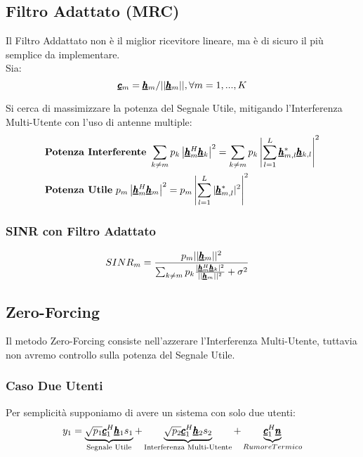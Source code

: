 \subsection{Filtro Adattato (MRC)}
Il Filtro Addattato non è il miglior ricevitore lineare, ma è di sicuro il più semplice da implementare.\\
Sia:
\begin{equation*}
    \pmb{\underline{c}}_m = \pmb{\underline{h}}_m / ||\pmb{\underline{h}}_m||, \forall m = 1,...,K
\end{equation*}

Si cerca di massimizzare la potenza del Segnale Utile, mitigando l'Interferenza Multi-Utente con l'uso di antenne multiple:
\begin{equation*}
\begin{aligned}
      &\textbf{Potenza Interferente} \ \sum_{k \neq m} p_k \left|\pmb{\underline{h}}^H_m \pmb{\underline{h}}_k  \right|^2 = \sum_{k \neq m} p_k \left|\sum_{l=1}^L \pmb{\underline{h}}^*_{m,l} \pmb{\underline{h}}_{k,l}  \right|^2 \\
    &\textbf{Potenza Utile} \ p_m \left|\pmb{\underline{h}}^H_m \pmb{\underline{h}}_m  \right|^2 = p_m \left|\sum_{l=1}^L |\pmb{\underline{h}}^*_{m,l}|^2 \right|^2
\end{aligned}
\end{equation*}

\subsubsection{SINR con Filtro Adattato}

\begin{equation*}
    \begin{aligned}
          SINR_m &= \frac{p_m ||\pmb{\underline{h}}_m||^2}{\sum_{k \neq m} p_k \frac{|\pmb{\underline{h}}^H_m \pmb{\underline{h}}_k |^2}{||\pmb{\underline{h}}_m||^2}+ \sigma^2}
    \end{aligned}
\end{equation*}


\subsection{Zero-Forcing}
Il metodo Zero-Forcing consiste nell'azzerare l'Interferenza Multi-Utente, tuttavia non avremo controllo sulla potenza del Segnale Utile.
\subsubsection{Caso Due Utenti}
Per semplicità supponiamo di avere un sistema con solo due utenti:\\
\begin{equation*}
    y_1 = \underbrace{\sqrt{p_1}\pmb{\underline{c}}_1^H \pmb{\underline{h}}_1 s_1}_{{\text{Segnale Utile}}} + \underbrace{\sqrt{p_2}\pmb{\underline{c}}_1^H \pmb{\underline{h}}_2 s_2}_{{\text{Interferenza Multi-Utente}}} + \underbrace{\pmb{\underline{c}}_1^H \pmb{\underline{n}}}_{Rumore Termico}
\end{equation*}


